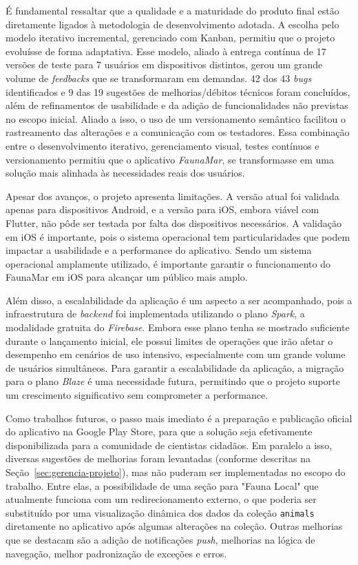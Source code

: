 É fundamental ressaltar que a qualidade e a maturidade do produto final estão diretamente ligados à metodologia de desenvolvimento adotada. A escolha pelo modelo iterativo incremental, gerenciado com Kanban, permitiu que o projeto evoluísse de forma adaptativa. Esse modelo, aliado à entrega contínua de 17 versões de teste para 7 usuários em dispositivos distintos, gerou um grande volume de \textit{feedbacks} que se transformaram em demandas. 42 dos 43 \textit{bugs} identificados e 9 das 19 sugestões de melhorias/débitos técnicos foram concluídos, além de refinamentos de usabilidade e da adição de funcionalidades não previstas no escopo inicial. Aliado a isso, o uso de um versionamento semântico facilitou o rastreamento das alterações e a comunicação com os testadores. Essa combinação entre o desenvolvimento iterativo, gerenciamento visual, testes contínuos e versionamento permitiu que o aplicativo \textit{FaunaMar}, se transformasse em uma solução mais alinhada às necessidades reais dos usuários.

Apesar dos avanços, o projeto apresenta limitações. A versão atual foi validada apenas para dispositivos Android, e a versão para iOS, embora viável com Flutter, não pôde ser testada por falta dos dispositivos necessários. A validação em iOS é importante, pois o sistema operacional tem particularidades que podem impactar a usabilidade e a performance do aplicativo. Sendo um sistema operacional amplamente utilizado, é importante garantir o funcionamento do FaunaMar em iOS para alcançar um público mais amplo.

Além disso, a escalabilidade da aplicação é um aspecto a ser acompanhado, pois a infraestrutura de \textit{backend} foi implementada utilizando o plano \textit{Spark}, a modalidade gratuita do \textit{Firebase}. Embora esse plano tenha se mostrado suficiente durante o lançamento inicial, ele possui limites de operações que irão afetar o desempenho em cenários de uso intensivo, especialmente com um grande volume de usuários simultâneos. Para garantir a escalabilidade da aplicação, a migração para o plano \textit{Blaze} é uma necessidade futura, permitindo que o projeto suporte um crescimento significativo sem comprometer a performance.

Como trabalhos futuros, o passo mais imediato é a preparação e publicação oficial do aplicativo na Google Play Store, para que a solução seja efetivamente disponibilizada para a comunidade de cientistas cidadãos. Em paralelo a isso, diversas sugestões de melhorias foram levantadas (conforme descritas na Seção~\ref{sec:gerencia-projeto}), mas não puderam ser implementadas no escopo do trabalho. Entre elas, a possibilidade de uma seção para "Fauna Local" que atualmente funciona com um redirecionamento externo, o que poderia ser substituído por uma visualização dinâmica dos dados da coleção \texttt{animals} diretamente no aplicativo após algumas alterações na coleção. Outras melhorias que se destacam são a adição de notificações \textit{push}, melhorias na lógica de navegação, melhor padronização de exceções e erros.

